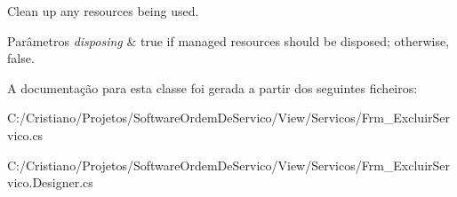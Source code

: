 Clean up any resources being used. 


\begin{DoxyParams}{Parâmetros}
{\em disposing} & true if managed resources should be disposed; otherwise, false.\\
\hline
\end{DoxyParams}


A documentação para esta classe foi gerada a partir dos seguintes ficheiros\+:\begin{DoxyCompactItemize}
\item 
C\+:/\+Cristiano/\+Projetos/\+Software\+Ordem\+De\+Servico/\+View/\+Servicos/Frm\+\_\+\+Excluir\+Servico.\+cs\item 
C\+:/\+Cristiano/\+Projetos/\+Software\+Ordem\+De\+Servico/\+View/\+Servicos/Frm\+\_\+\+Excluir\+Servico.\+Designer.\+cs\end{DoxyCompactItemize}
